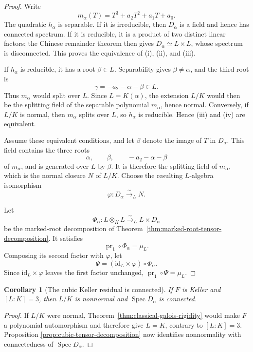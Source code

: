 \documentclass[11pt]{article}
\newtheorem{corollary}[theorem]{Corollary}
\theoremstyle{remark}
\theoremstyle{definition}
\DeclareMathOperator{\Spec}{Spec}
\newcommand{\id}{\mathrm{id}}
\begin{document}
\begin{proof}
Write
\[
  m_\alpha(T)=T^3+a_2T^2+a_1T+a_0.
\]
The quadratic \(h_\alpha\) is separable.  If it is irreducible, then
\(D_\alpha\) is a field and hence has connected spectrum.  If it is
reducible, it is a product of two distinct linear factors; the Chinese
remainder theorem then gives \(D_\alpha\simeq L\times L\), whose spectrum
is disconnected.  This proves the equivalence of \textup{(i)},
\textup{(ii)}, and \textup{(iii)}.

If \(h_\alpha\) is reducible, it has a root \(\beta\in L\).
Separability gives \(\beta\neq\alpha\), and the third root is
\[
  \gamma=-a_2-\alpha-\beta\in L.
\]
Thus \(m_\alpha\) would split over \(L\).  Since
\(L=K(\alpha)\), the extension \(L/K\) would then be the splitting
field of the separable polynomial \(m_\alpha\), hence normal.  Conversely,
if \(L/K\) is normal, then \(m_\alpha\) splits over \(L\), so
\(h_\alpha\) is reducible.  Hence \textup{(iii)} and \textup{(iv)} are
equivalent.

Assume these equivalent conditions, and let \(\beta\) denote the image of
\(T\) in \(D_\alpha\).  This field contains the three roots
\[
  \alpha,\qquad \beta,\qquad -a_2-\alpha-\beta
\]
of \(m_\alpha\), and is generated over \(L\) by \(\beta\).  It is
therefore the splitting field of \(m_\alpha\), which is the normal
closure \(N\) of \(L/K\).  Choose the resulting \(L\)-algebra
isomorphism
\[
  \varphi\colon D_\alpha\xrightarrow{\sim}_L N.
\]

Let
\[
  \Phi_\alpha\colon
  L\otimes_KL
  \xrightarrow{\sim}_L
  L\times D_\alpha
\]
be the marked-root decomposition of
Theorem~\ref{thm:marked-root-tensor-decomposition}.  It satisfies
\[
  \operatorname{pr}_1\circ\Phi_\alpha=\mu_L.
\]
Composing its second factor with \(\varphi\), let
\[
  \Psi=(\id_L\times\varphi)\circ\Phi_\alpha.
\]
Since \(\id_L\times\varphi\) leaves the first factor unchanged,
\(\operatorname{pr}_1\circ\Psi=\mu_L\).
\end{proof}

\begin{corollary}[The cubic Keller residual is connected]
\label{cor:cubic-keller-residual-connected}
If \(F\) is Keller and \([L:K]=3\), then \(L/K\) is nonnormal and
\(\Spec D_\alpha\) is connected.
\end{corollary}

\begin{proof}
If \(L/K\) were normal, Theorem~\ref{thm:classical-galois-rigidity}
would make \(F\) a polynomial automorphism and therefore give \(L=K\),
contrary to \([L:K]=3\).  Proposition
\ref{prop:cubic-tensor-decomposition} now identifies nonnormality with
connectedness of \(\Spec D_\alpha\).
\end{proof}
\end{document}
